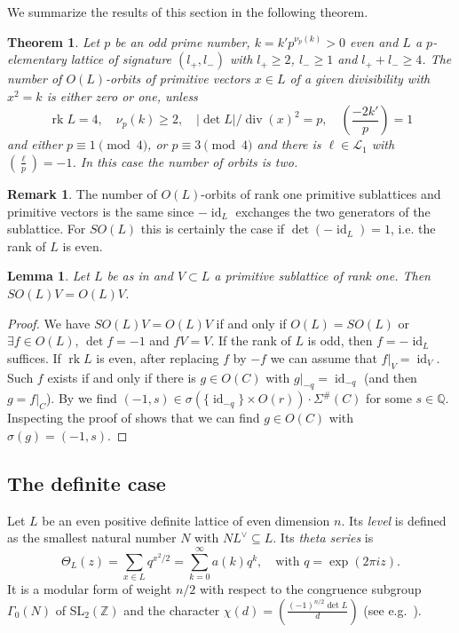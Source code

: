 \documentclass{amsart}
\theoremstyle{definition}
\newtheorem{remark}[definition]{Remark}
\theoremstyle{plain}
\newtheorem{theorem}[definition]{Theorem}
\newtheorem{lemma}[definition]{Lemma}
\DeclareMathOperator{\rk}{rk}
\DeclareMathOperator{\id}{id}
\newcommand{\QQ}{\mathbb{Q}}
\newcommand{\ZZ}{\mathbb{Z}}
\newcommand{\leg}[2]{\left( \frac{#1}{#2}\right)}
\renewcommand{\div}{\mathop{div}}
\begin{document}
We summarize the results of this section in the following theorem.
\begin{theorem}\label{thm:orbits}
 Let $p$ be an odd prime number, $k= k'p^{\nu_p(k)}>0$ even and $L$ a $p$-elementary lattice of signature $(l_+,l_-)$ with $l_+\geq 2$, $l_-\geq 1$ and $l_+ + l_- \geq 4$.
 The number of $O(L)$-orbits of primitive vectors $x \in L$ of a given divisibility with $x^2=k$ is either zero or one, unless
 \[\rk L = 4,\quad \nu_p(k)\geq 2,\quad |\det L| /\div(x)^2=p,\quad \left(\frac{-2k'}{p}\right)=1\]
 and either $p \equiv 1 \pmod 4$, or $p\equiv 3 \pmod 4$ and there is $\ell\in {\mathcal{L}_1}$ with $\leg{\ell}{p}=-1$.
 In this case the number of orbits is two.
 \end{theorem}
\begin{remark}
 The number of $O(L)$-orbits of rank one primitive sublattices and primitive vectors is the same since $-\id_L$ exchanges the two generators of the sublattice. For $SO(L)$ this is certainly the case if $\det(-\id_L)=1$, i.e. the rank of $L$ is even.
\end{remark}

\begin{lemma}
 Let $L$ be as in  and $V \subset L$ a primitive sublattice of rank one. Then $SO(L)V = O(L)V$.
\end{lemma}
\begin{proof}
We have $SO(L)V = O(L)V$ if and only if $O(L) = SO(L)$ or $\exists f \in O(L)$, $\det f=-1$ and $fV=V$.
If the rank of $L$ is odd, then $f = -\id_L$ suffices. If $\rk L$ is even, after replacing $f$ by $-f$ we can assume that $f\vert_V = \id_V$.
Such $f$ exists if and only if there is $g \in O(C)$ with $g|_{-q}=\id_{-q}$ (and then $g=f|_C$).
By  we find
$(-1,s) \in \sigma(\{\id_{-q}\} \times O(r)) \cdot \Sigma^\#(C)$ for some $s \in \QQ$. Inspecting the proof of \cite[VIII Thm.\ 2.3]{miranda_morrison:embeddings} shows that
 we can find $g\in O(C)$ with $\sigma(g) = (-1,s)$.
\end{proof}

\subsection{The definite case} \label{appendix:fixed}
Let $L$ be an even positive definite lattice of even dimension $n$.
Its \emph{level} is defined as the smallest natural number $N$  with $N L^\vee \subseteq L$.
 Its \emph{theta series} is
 \[\Theta_L(z) = \sum_{x \in L }q^{x^2/2}= \sum_{k=0}^\infty a(k)q^k, \quad \mbox{with } q=\exp(2\pi i z).\]
 It is a modular form of weight $n/2$ with respect to the congruence subgroup $\Gamma_0(N)$ of SL$_2(\ZZ)$ and the character $\chi(d)=\leg{(-1)^{n/2}\det L}{d}$ (see e.g.\ \cite[Thm.\ 3.2]{ebeling}).
 
\end{document}
